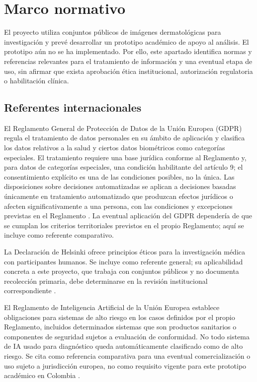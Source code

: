 \chapter{Marco normativo}
{}

El proyecto utiliza conjuntos públicos de imágenes dermatológicas para investigación y prevé desarrollar un prototipo académico de apoyo al análisis. El prototipo aún no se ha implementado. Por ello, este apartado identifica normas y referencias relevantes para el tratamiento de información y una eventual etapa de uso, sin afirmar que exista aprobación ética institucional, autorización regulatoria o habilitación clínica.

\section{Referentes internacionales}
{}

El Reglamento General de Protección de Datos de la Unión Europea (GDPR) regula el tratamiento de datos personales en su ámbito de aplicación y clasifica los datos relativos a la salud y ciertos datos biométricos como categorías especiales. El tratamiento requiere una base jurídica conforme al Reglamento y, para datos de categorías especiales, una condición habilitante del artículo 9; el consentimiento explícito es una de las condiciones posibles, no la única. Las disposiciones sobre decisiones automatizadas se aplican a decisiones basadas únicamente en tratamiento automatizado que produzcan efectos jurídicos o afecten significativamente a una persona, con las condiciones y excepciones previstas en el Reglamento \parencite{ue2016gdpr}. La eventual aplicación del GDPR dependería de que se cumplan los criterios territoriales previstos en el propio Reglamento; aquí se incluye como referente comparativo.

La Declaración de Helsinki ofrece principios éticos para la investigación médica con participantes humanos. Se incluye como referente general; su aplicabilidad concreta a este proyecto, que trabaja con conjuntos públicos y no documenta recolección primaria, debe determinarse en la revisión institucional correspondiente \parencite{wma2024helsinki}.

El Reglamento de Inteligencia Artificial de la Unión Europea establece obligaciones para sistemas de alto riesgo en los casos definidos por el propio Reglamento, incluidos determinados sistemas que son productos sanitarios o componentes de seguridad sujetos a evaluación de conformidad. No todo sistema de IA usado para diagnóstico queda automáticamente clasificado como de alto riesgo. Se cita como referencia comparativa para una eventual comercialización o uso sujeto a jurisdicción europea, no como requisito vigente para este prototipo académico en Colombia \parencite{ue2024aiact}.

